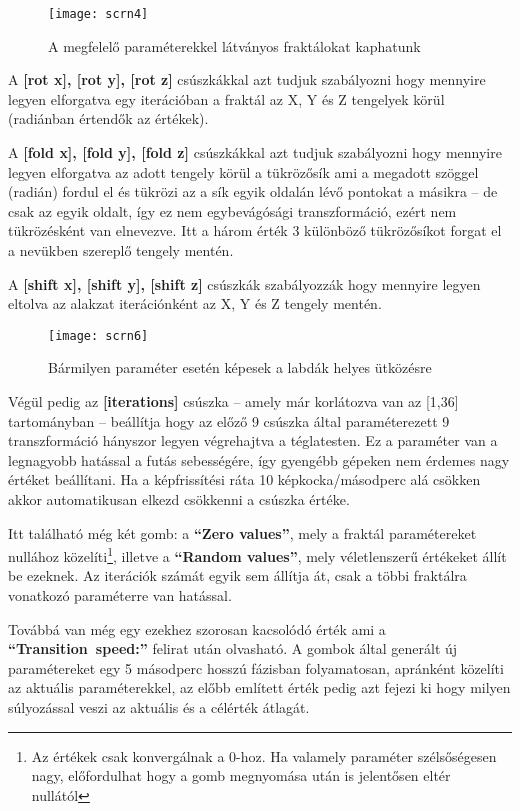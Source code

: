 \begin{figure}[H]
	\centering
	\texttt{[image: scrn4]}
	\caption{A megfelelő paraméterekkel látványos fraktálokat kaphatunk}
	\label{fig:erdekes1}
\end{figure}

A \textbf{[rot x], [rot y], [rot z]} csúszkákkal azt tudjuk szabályozni hogy mennyire legyen elforgatva egy iterációban a fraktál az X, Y és Z tengelyek körül (radiánban értendők az értékek). 

A \textbf{[fold x], [fold y], [fold z]} csúszkákkal azt tudjuk szabályozni hogy mennyire legyen elforgatva az adott tengely körül a tükrözősík ami a megadott szöggel (radián) fordul el és tükrözi az a sík egyik oldalán lévő pontokat a másikra -- de csak az egyik oldalt, így ez nem egybevágósági transzformáció, ezért nem tükrözésként van elnevezve. Itt a három érték 3 különböző tükrözősíkot forgat el a nevükben szereplő tengely mentén. 

A \textbf{[shift x], [shift y], [shift z]} csúszkák szabályozzák hogy mennyire legyen eltolva az alakzat iterációnként az X, Y és Z tengely mentén.

\begin{figure}[H]
	\centering
	\texttt{[image: scrn6]}
	\caption{Bármilyen paraméter esetén képesek a labdák helyes ütközésre}
	\label{fig:erdekes2}
\end{figure}

Végül pedig az \textbf{[iterations]} csúszka -- amely már korlátozva van az [1,36] tartományban -- beállítja hogy az előző 9 csúszka által paraméterezett 9 transzformáció hányszor legyen végrehajtva a téglatesten. Ez a paraméter van a legnagyobb hatással a futás sebességére, így gyengébb gépeken nem érdemes nagy értéket beállítani. Ha a képfrissítési ráta 10 képkocka/másodperc alá csökken akkor automatikusan elkezd csökkenni a csúszka értéke.

Itt található még két gomb: a \textbf{``Zero values''}, mely a fraktál paramétereket nullához közelíti\footnote{Az értékek csak konvergálnak a 0-hoz. Ha valamely paraméter szélsőségesen nagy, előfordulhat hogy a gomb megnyomása után is jelentősen eltér nullától}, illetve a \textbf{``Random values''}, mely véletlenszerű értékeket állít be ezeknek. Az iterációk számát egyik sem állítja át, csak a többi fraktálra vonatkozó paraméterre van hatással. 

Továbbá van még egy ezekhez szorosan kacsolódó érték ami a \textbf{``Transition~speed:''} felirat után olvasható. A gombok által generált új paramétereket egy 5 másodperc hosszú fázisban folyamatosan, apránként közelíti az aktuális paraméterekkel, az előbb említett érték pedig azt fejezi ki hogy milyen súlyozással veszi az aktuális és a célérték átlagát.

